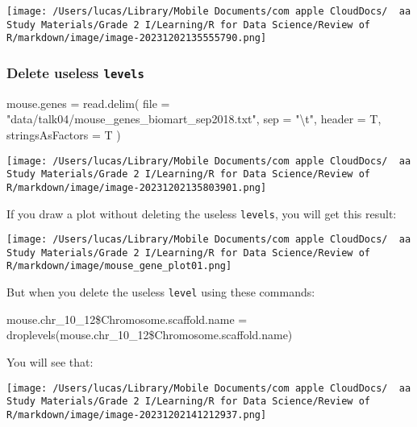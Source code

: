 \documentclass[
]{article}
\let\oldincludegraphics\includegraphics
\renewcommand{\includegraphics}[2][]{\begin{center}\oldincludegraphics[#1]{#2}\end{center}}
\newenvironment{Shaded}{}{}
\newcommand{\AttributeTok}[1]{\textcolor[rgb]{0.49,0.56,0.16}{#1}}
\newcommand{\FunctionTok}[1]{\textcolor[rgb]{0.02,0.16,0.49}{#1}}
\newcommand{\NormalTok}[1]{#1}
\newcommand{\OtherTok}[1]{\textcolor[rgb]{0.00,0.44,0.13}{#1}}
\newcommand{\SpecialCharTok}[1]{\textcolor[rgb]{0.25,0.44,0.63}{#1}}
\newcommand{\StringTok}[1]{\textcolor[rgb]{0.25,0.44,0.63}{#1}}
\begin{document}
\texttt{[image: /Users/lucas/Library/Mobile Documents/com~apple~CloudDocs/~~aa Study Materials/Grade 2 I/Learning/R for Data Science/Review of R/markdown/image/image-20231202135555790.png]}

\hypertarget{delete-useless-levels}{%
\subsubsection{\texorpdfstring{Delete useless
\texttt{levels}}{Delete useless levels}}\label{delete-useless-levels}}

\begin{Shaded}
\begin{Highlighting}[]
\NormalTok{mouse.genes }\OtherTok{=}
  \FunctionTok{read.delim}\NormalTok{(}
    \AttributeTok{file =} \StringTok{"data/talk04/mouse\_genes\_biomart\_sep2018.txt"}\NormalTok{,}
    \AttributeTok{sep =} \StringTok{"}\SpecialCharTok{\textbackslash{}t}\StringTok{"}\NormalTok{,}
    \AttributeTok{header =}\NormalTok{ T, }
    \AttributeTok{stringsAsFactors =}\NormalTok{ T }
\NormalTok{  )}
\end{Highlighting}
\end{Shaded}

\texttt{[image: /Users/lucas/Library/Mobile Documents/com~apple~CloudDocs/~~aa Study Materials/Grade 2 I/Learning/R for Data Science/Review of R/markdown/image/image-20231202135803901.png]}

If you draw a plot without deleting the useless \texttt{levels}, you
will get this result:

\texttt{[image: /Users/lucas/Library/Mobile Documents/com~apple~CloudDocs/~~aa Study Materials/Grade 2 I/Learning/R for Data Science/Review of R/markdown/image/mouse\_gene\_plot01.png]}

But when you delete the useless \texttt{level} using these commands:

\begin{Shaded}
\begin{Highlighting}[]
\NormalTok{mouse.chr\_10\_12}\SpecialCharTok{\$}\NormalTok{Chromosome.scaffold.name }\OtherTok{=}
  \FunctionTok{droplevels}\NormalTok{(mouse.chr\_10\_12}\SpecialCharTok{\$}\NormalTok{Chromosome.scaffold.name)}
\end{Highlighting}
\end{Shaded}

You will see that:

\texttt{[image: /Users/lucas/Library/Mobile Documents/com~apple~CloudDocs/~~aa Study Materials/Grade 2 I/Learning/R for Data Science/Review of R/markdown/image/image-20231202141212937.png]}
\end{document}
